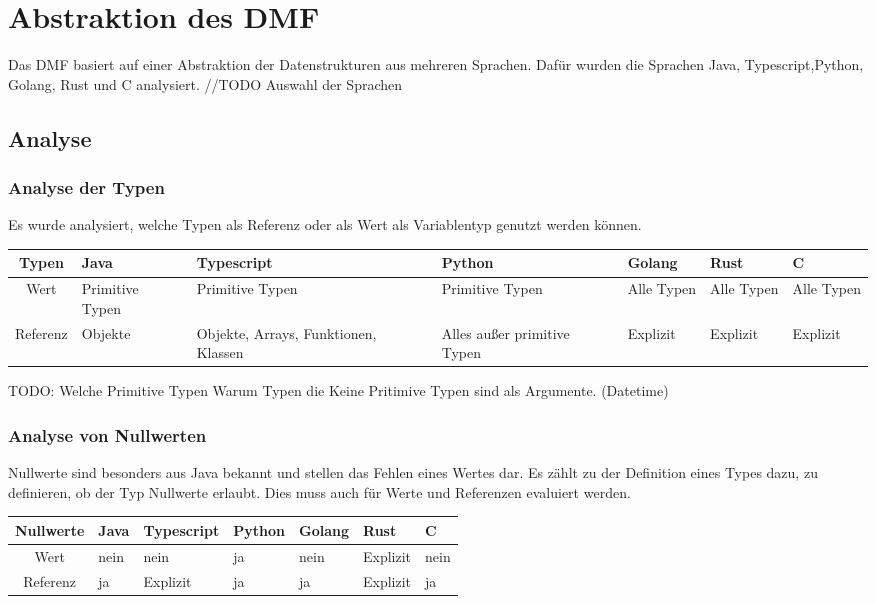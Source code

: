 \documentclass[./einleitung.tex]{subfiles}
\begin{document}
\section{Abstraktion des DMF}
Das DMF basiert auf einer Abstraktion der Datenstrukturen aus mehreren Sprachen.
Dafür wurden die Sprachen Java, Typescript,Python, Golang, Rust und C analysiert.
//TODO Auswahl der Sprachen
\subsection{Analyse}
\subsubsection{Analyse der Typen}
Es wurde analysiert, welche Typen als Referenz oder als Wert als Variablentyp genutzt werden können.
\begin{center}
\begin{tabular}{| c || m{4em} | m{5em} | m{5em} | m{4.5em} | m{4.5em} | m{4.5em} |}
\hline
Typen & Java & Typescript & Python & Golang & Rust & C \\
\hline
Wert & Primitive Typen & Primitive Typen & Primitive Typen & Alle Typen & Alle Typen & Alle Typen \\
\hline
Referenz & Objekte & Objekte, Arrays, Funktionen, Klassen & Alles außer primitive Typen & Explizit & Explizit & Explizit \\
\hline
\end{tabular}
\end{center}
TODO:
Welche Primitive Typen 
Warum Typen die Keine Pritimive Typen sind als Argumente. (Datetime)
\subsubsection{Analyse von Nullwerten}
Nullwerte sind besonders aus Java bekannt und stellen das Fehlen eines Wertes dar. Es zählt zu der Definition eines Types dazu, zu definieren, ob der Typ Nullwerte erlaubt.
Dies muss auch für Werte und Referenzen evaluiert werden.
\begin{center}
\begin{tabular}{| c || m{4em} | m{5em} | m{5em} | m{4.5em} | m{4.5em} | m{4.5em} |}
\hline
Nullwerte & Java & Typescript & Python & Golang & Rust & C \\
\hline
Wert & nein & nein & ja & nein & Explizit & nein \\
\hline
Referenz & ja & Explizit & ja & ja & Explizit & ja \\
\hline
\end{tabular}
\end{center}
\end{document}

